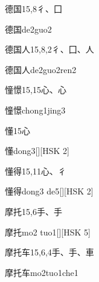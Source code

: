 \begin{entry}{德国}{15,8}{⼻、⼞}
  \begin{phonetics}{德国}{de2guo2}
  \end{phonetics}
\end{entry}

\begin{entry}{德国人}{15,8,2}{⼻、⼞、⼈}
  \begin{phonetics}{德国人}{de2guo2ren2}
  \end{phonetics}
\end{entry}

\begin{entry}{憧憬}{15,15}{⼼、⼼}
  \begin{phonetics}{憧憬}{chong1jing3}
  \end{phonetics}
\end{entry}

\begin{entry}{懂}{15}{⼼}
  \begin{phonetics}{懂}{dong3}[][HSK 2]
  \end{phonetics}
\end{entry}

\begin{entry}{懂得}{15,11}{⼼、⼻}
  \begin{phonetics}{懂得}{dong3 de5}[][HSK 2]
  \end{phonetics}
\end{entry}

\begin{entry}{摩托}{15,6}{⼿、⼿}
  \begin{phonetics}{摩托}{mo2 tuo1}[][HSK 5]
  \end{phonetics}
\end{entry}

\begin{entry}{摩托车}{15,6,4}{⼿、⼿、⾞}
  \begin{phonetics}{摩托车}{mo2tuo1che1}
  \end{phonetics}
\end{entry}

